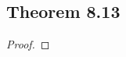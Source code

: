 \documentclass[../../main.tex]{subfiles}
\begin{document}
\subsection{Theorem 8.13}
\begin{wts}

\end{wts}
\begin{proof}

\end{proof}
\end{document}
